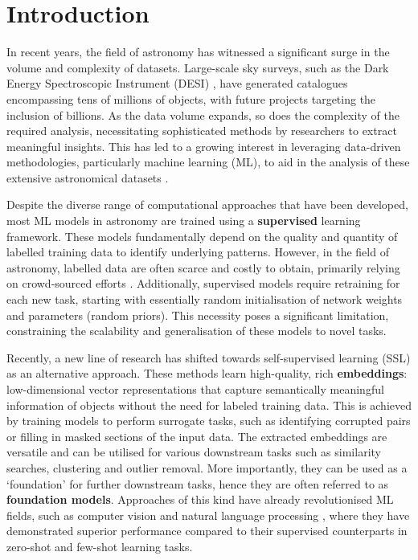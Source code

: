 \documentclass[a4paper,12pt]{article}
\begin{document}
\section{Introduction}

In recent years, the field of astronomy has witnessed a significant surge in the volume and complexity of datasets. Large-scale sky surveys, such as the Dark Energy Spectroscopic Instrument (DESI) \cite{DESI}, have generated catalogues encompassing tens of millions of objects, with future projects targeting the inclusion of billions. As the data volume expands, so does the complexity of the required analysis, necessitating sophisticated methods by researchers to extract meaningful insights. This has led to a growing interest in leveraging data-driven methodologies, particularly machine learning (ML), to aid in the analysis of these extensive astronomical datasets \cite{ivezic2020statistics}.

Despite the diverse range of computational approaches that have been developed, most ML models in astronomy are trained using a \textbf{supervised} learning framework. These models fundamentally depend on the quality and quantity of labelled training data to identify underlying patterns. However, in the field of astronomy, labelled data are often scarce and costly to obtain, primarily relying on crowd-sourced efforts \cite{willett2013galaxy}. Additionally, supervised models require retraining for each new task, starting with essentially random initialisation of network weights and parameters (random priors). This necessity poses a significant limitation, constraining the scalability and generalisation of these models to novel tasks.

Recently, a new line of research has shifted towards self-supervised learning (SSL) as an alternative approach. These methods learn high-quality, rich \textbf{embeddings}: low-dimensional vector representations that capture semantically meaningful information of objects without the need for labeled training data. This is achieved by training models to perform surrogate tasks, such as identifying corrupted pairs or filling in masked sections of the input data. The extracted embeddings are versatile and can be utilised for various downstream tasks such as similarity searches, clustering and outlier removal. More importantly, they can be used as a `foundation' for further downstream tasks, hence they are often referred to as \textbf{foundation models}.  Approaches of this kind have already revolutionised ML fields, such as computer vision \cite{he2021maskedautoencodersscalablevision} and natural language processing \cite{radford2019language}, where they have demonstrated superior performance compared to their supervised counterparts in zero-shot and few-shot learning tasks.
\end{document}
